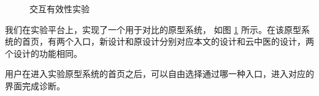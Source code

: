 \begin{figure}[h]
    \centering
    \caption{交互有效性实验}
    \label{fig:interface}
\end{figure}

我们在实验平台上，实现了一个用于对比的原型系统， 如图  \ref{fig:interface} 所示。在该原型系统的首页，有两个入口，新设计和原设计分别对应本文的设计和云中医的设计，两个设计的功能相同。

用户在进入实验原型系统的首页之后，可以自由选择通过哪一种入口，进入对应的界面完成诊断。

